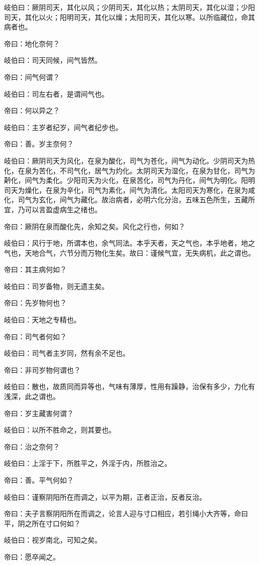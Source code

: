 \documentclass{article}%
\begin{document}
岐伯曰：厥阴司天，其化以风；少阴司天，其化以热；太阴司天，其化以湿；少阳司天，其化以火；阳明司天，其化以燥；太阳司天，其化以寒。以所临藏位，命其病者也。

帝曰：地化奈何？

岐伯曰：司天同候，间气皆然。

帝曰：间气何谓？

岐伯曰：司左右者，是谓间气也。

帝曰：何以异之？

岐伯曰：主岁者纪岁，间气者纪步也。

帝曰：善。岁主奈何？

岐伯曰：厥阴司天为风化，在泉为酸化，司气为苍化，间气为动化。少阴司天为热化，在泉为苦化，不司气化，居气为灼化。太阴司天为湿化，在泉为甘化，司气为黅化，间气为柔化。少阳司天为火化，在泉苦化，司气为丹化，间气为明化。阳明司天为燥化，在泉为辛化，司气为素化，间气为清化。太阳司天为寒化，在泉为咸化，司气为玄化，间气为藏化。故治病者，必明六化分治，五味五色所生，五藏所宜，乃可以言盈虚病生之绪也。

帝曰：厥阴在泉而酸化先，余知之矣。风化之行也，何如？

岐伯曰：风行于地，所谓本也，余气同法。本乎天者，天之气也，本乎地者，地之气也，天地合气，六节分而万物化生矣。故曰：谨候气宜，无失病机，此之谓也。

帝曰：其主病何如？

岐伯曰：司岁备物，则无遗主矣。

帝曰：先岁物何也？

岐伯曰：天地之专精也。

帝曰：司气者何如？

岐伯曰：司气者主岁同，然有余不足也。

帝曰：非司岁物何谓也？

岐伯曰：散也，故质同而异等也，气味有薄厚，性用有躁静，治保有多少，力化有浅深，此之谓也。

帝曰：岁主藏害何谓？

岐伯曰：以所不胜命之，则其要也。

帝曰：治之奈何？

岐伯曰：上淫于下，所胜平之，外淫于内，所胜治之。

帝曰：善。平气何如？

岐伯曰：谨察阴阳所在而调之，以平为期，正者正治，反者反治。

帝曰：夫子言察阴阳所在而调之，论言人迎与寸口相应，若引绳小大齐等，命曰平，阴之所在寸口何如？

岐伯曰：视岁南北，可知之矣。

帝曰：愿卒闻之。
\end{document}
